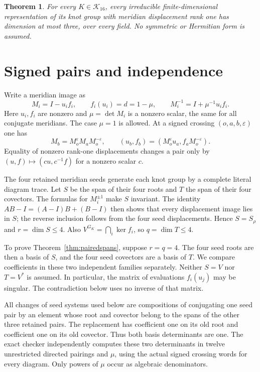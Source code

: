 \documentclass[11pt]{article}
\newtheorem{theorem}{Theorem}
\begin{document}
\begin{theorem}\label{thm:all16}
For every $K\in\mathcal K_{16}$, every irreducible finite-dimensional
representation of its knot group with meridian displacement rank one
has dimension at most three, over every field.
No symmetric or Hermitian form is assumed.
\end{theorem}

\section{Signed pairs and independence}

Write a meridian image as
\[
 M_i=I-u_if_i,\qquad f_i(u_i)=d=1-\mu,
 \qquad M_i^{-1}=I+\mu^{-1}u_if_i.
\]
Here $u_i,f_i$ are nonzero and $\mu=\det M_i$ is a nonzero scalar,
the same for all conjugate meridians. The case $\mu=1$ is allowed.
At a signed crossing $(o,a,b,\varepsilon)$ one has
\[
 M_b=M_o^\varepsilon M_aM_o^{-\varepsilon},\qquad
 (u_b,f_b)=(M_o^\varepsilon u_a,f_aM_o^{-\varepsilon}).
\]
Equality of nonzero rank-one displacements changes a pair only by
$(u,f)\mapsto(cu,c^{-1}f)$ for a nonzero scalar $c$.

The four retained meridian seeds generate each knot group by a complete
literal diagram trace. Let $S$ be the span of their four roots and $T$
the span of their four covectors. The formulas for $M_i^{\pm1}$ make
$S$ invariant. The identity $AB-I=(A-I)B+(B-I)$ then shows that every
displacement image lies in $S$; the reverse inclusion follows from the
four seed displacements. Hence $S=S_\rho$ and $r=\dim S\le4$.
Also $V^{G_K}=\bigcap_i\ker f_i$, so $q=\dim T\le4$.

To prove Theorem~\ref{thm:pairedspans}, suppose $r=q=4$.
The four seed roots are then a basis of $S$, and the four seed
covectors are a basis of $T$. We compare coefficients in these two
independent families separately. Neither $S=V$ nor $T=V^*$ is
assumed. In particular, the matrix of evaluations $f_i(u_j)$ may be
singular. The contradiction below uses no inverse of that matrix.

All changes of seed systems used below are compositions of conjugating
one seed pair by an element whose root and covector belong to the spans
of the other three retained pairs. The replacement has coefficient one
on its old root and coefficient one on its old covector. Thus both basis
determinants are one. The exact checker independently computes these
two determinants in twelve unrestricted directed pairings and $\mu$,
using the actual signed crossing words for every diagram.
Only powers of $\mu$ occur as algebraic denominators.
\end{document}
